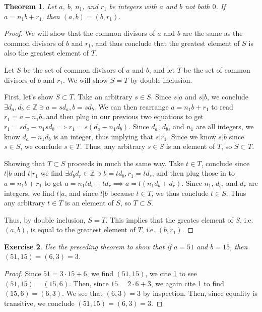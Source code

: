 \documentclass{article}
\newtheorem{thm}{Theorem}[section]
\newtheorem{ex}[thm]{Exercise}
\numberwithin{equation}{thm}
\begin{document}
\pagebreak



\begin{thm} \label{1.33}
  Let $a$, $b$, $n_1$, and $r_1$ be integers with $a$ and $b$ not both $0$. If $a = n_1b + r_1$, then $(a,b) = (b,r_1)$.
\end{thm}

\begin{proof}
  We will show that the common divisors of $a$ and $b$ are the same as the common divisors of $b$ and $r_1$, and thus conclude that the greatest element of $S$ is also the greatest element of $T$.

  Let $S$ be the set of common divisors of $a$ and $b$, and let $T$ be the set of common divisors of $b$ and $r_1$. We will show $S = T$ by double inclusion.

  First, let's show $S \subset T$. Take an arbitrary $s \in S$. Since $s|a$ and $s|b$, we conclude $\exists d_a, d_b \in \mathbb{Z} \ni a = sd_a, b=sd_b$. We can then rearrange $a = n_1b + r_1$ to read $r_1 = a - n_1b$, and then plug in our previous two equations to get $r_1 = sd_a - n_1 sd_b \implies r_1 = s(d_a - n_1 d_b)$.
  Since $d_a$, $d_b$, and $n_1$ are all integers, we know $d_a - n_1 d_b$ is an integer, thus implying that $s | r_1$. Since we know $s|b$ since $s \in S$, we conclude $s \in T$. Thus, any arbitrary $s \in S$ is an element of $T$, so $S \subset T$.

  Showing that $T \subset S$ proceeds in much the same way. Take $t \in T$, conclude since $t|b$ and $t|r_1$ we find $\exists d_b d_r \in \mathbb{Z} \ni b = td_b, r_1 = td_r$, and then plug those in to $a = n_1b + r_1$ to get $a = n_1 td_b + td_r \implies a = t(n_1 d_b + d_r)$. Since $n_1$, $d_b$, and $d_r$ are integers, we find $t | a$, and since $t | b$ because $t \in T$, we thus conclude $t \in S$.
  Thus any arbitrary $t \in T$ is an element of $S$, so $T \subset S$.

  Thus, by double inclusion, $S = T$. This implies that the greates element of $S$, i.e. $(a, b)$, is equal to the greatest element of $T$, i.e. $(b, r_1)$.
\end{proof}



\begin{ex} \label{1.34}
  Use the preceding theorem to show that if $a = 51$ and $b = 15$, then $(51, 15) = (6, 3) = 3$.
\end{ex}

\begin{proof}
  Since $51 = 3 \cdot 15 + 6$, we find $(51, 15)$, we cite \ref{1.33} to see $(51, 15) = (15, 6)$. Then, since $15 = 2 \cdot 6 + 3$, we again cite \ref{1.33} to find $(15, 6) = (6, 3)$. We see that $(6, 3) = 3$ by inspection. Then, since equality is transitive, we conclude $(51, 15) = (6, 3) = 3$.
\end{proof}
\end{document}
